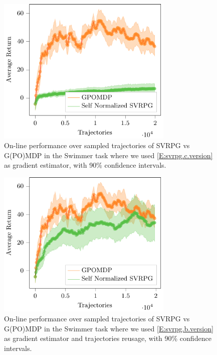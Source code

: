 \begin{figure}[h]
	\begin{minipage}[h]{1\textwidth}
		\centering
		\includegraphics[width=0.75\textwidth]{Images/Experiments/swimmer_GPOMDP_vs_SN_SVRPG_C.pdf}
		\vspace{-0.1in}
		\caption{On-line performance over sampled trajectories of \acs{SVRPG} vs G(PO)MDP in the Swimmer task where we used \ref{E:svrpg.c.version} as gradient estimator, with 90\% confidence intervals.}
		\label{fig:swimmerseven}
	\end{minipage}
	\vspace{-0.15in}
\end{figure}

\begin{figure}[h]
	\begin{minipage}[h]{1\textwidth}
		\centering
		\includegraphics[width=0.75\textwidth]{Images/Experiments/swimmer_GPOMDP_vs_SN_SVRPG_B_reuse.pdf}
		\vspace{-0.1in}
		\caption{On-line performance over sampled trajectories of \acs{SVRPG} vs G(PO)MDP in the Swimmer task where we used \ref{E:svrpg.b.version} as gradient estimator and trajectories reusage, with 90\% confidence intervals.}
		\label{fig:swimmereight}
	\end{minipage}
	\vspace{-0.15in}
\end{figure}



